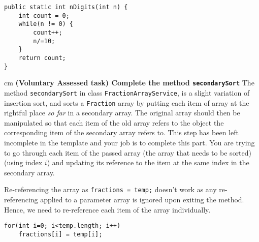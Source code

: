 \begin{questions}
\begin{solution}
\begin{lstlisting}
public static int nDigits(int n) {
	int count = 0;
	while(n != 0) {
		count++;
		n/=10;
	}
	return count;
}	
\end{lstlisting}
\end{solution}


 cm \question  \textbf{(Voluntary Assessed task) Complete the method \texttt{secondarySort}} \vskip 0.5cm
The method \texttt{secondarySort} in class \texttt{FractionArrayService}, is a slight variation of insertion sort, and sorts a \texttt{Fraction} array by putting each item of array at the rightful place \emph{so far} in a secondary array. The original array should then be manipulated so that each item of the old array refers to the object the corresponding item of the secondary array refers to. This step has been left incomplete in the template and your job is to complete this part. You are trying to go through each item of the passed array (the array that needs to be sorted) (using index $i$) and updating its reference to the item at the same index in the secondary array.

\begin{solution}
Re-referencing the array as \texttt{fractions = temp;} doesn't work as any re-referencing applied to a parameter array is ignored upon exiting the method. Hence, we need to re-reference each item of the array individually.
\begin{lstlisting}
for(int i=0; i<temp.length; i++)
	fractions[i] = temp[i];
\end{lstlisting}
\end{solution}

\end{questions}

